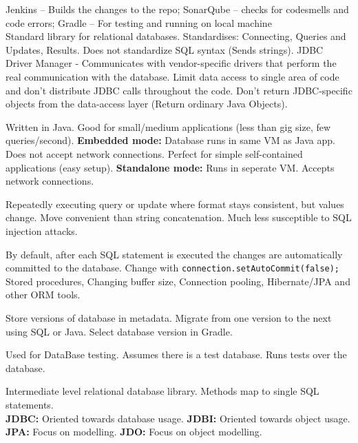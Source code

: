 \documentclass[number]{assignment}
\begin{document}
\begin{landscape}
\begin{multicols}{3}
Jenkins -- Builds the changes to the repo; SonarQube -- checks for codesmells and code errors; Gradle -- For testing and running on local machine\\

Standard library for relational databases. Standardises: Connecting, Queries and Updates, Results. Does not standardize SQL syntax (Sends strings).
JDBC Driver Manager - Communicates with vendor-specific drivers that perform the real communication with the database.
Limit data access to single area of code and don't distribute JDBC calls throughout the code. Don't return JDBC-specific objects from the data-access layer (Return ordinary Java Objects).

Written in Java. Good for small/medium applications (less than gig size, few queries/second). \textbf{Embedded mode:} Database runs in same VM as Java app. Does not accept network connections. Perfect for simple self-contained applications (easy setup). \textbf{Standalone mode:} Runs in seperate VM. Accepts network connections.

Repeatedly executing query or update where format stays consistent, but values change.
Move convenient than string concatenation. Much less susceptible to SQL injection attacks.

By default, after each SQL statement is executed the changes are automatically committed to the database. Change with \texttt{connection.setAutoCommit(false);}
Stored procedures, Changing buffer size, Connection pooling, Hibernate/JPA and other ORM tools.

Store versions of database in metadata. Migrate from one version to the next using SQL or Java. Select database version in Gradle.

Used for DataBase testing. Assumes there is a test database. Runs tests over the database.

Intermediate level relational database library. Methods map to single SQL statements.\\

\textbf{JDBC:} Oriented towards database usage. \textbf{JDBI:} Oriented towards object usage. \textbf{JPA:} Focus on modelling. \textbf{JDO:} Focus on object modelling.

\end{multicols}
\end{landscape}
\end{document}
